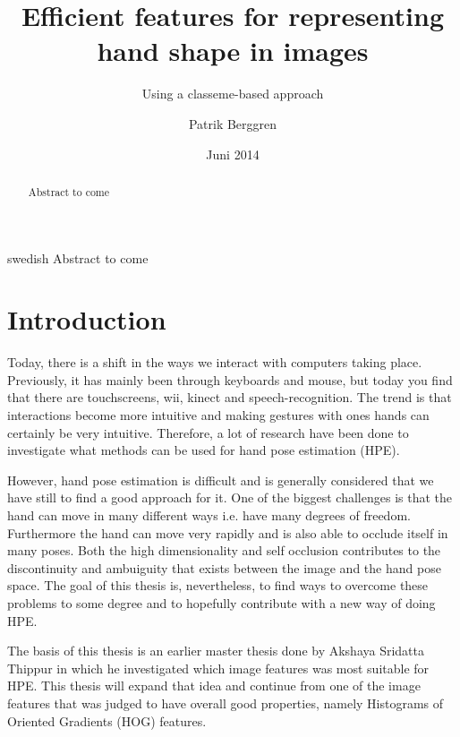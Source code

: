 \documentclass[a4paper,11pt]{kth-mag}
\title{Efficient features for representing hand shape in images}
\subtitle{Using a classeme-based approach}
\author{Patrik Berggren}
\date{Juni 2014}
\begin{document}
\frontmatter
\pagestyle{empty}
\removepagenumbers
\maketitle
{}



\begin{abstract}
Abstract to come
\end{abstract}
\clearpage
\begin{foreignabstract}{swedish}
Abstract to come
\end{foreignabstract}
\clearpage
\tableofcontents*
\mainmatter
\pagestyle{newchap}

\section{Introduction}
Today, there is a shift in the ways we interact with computers taking place.
Previously, it has mainly been through keyboards and mouse, but today you find that there are touchscreens, wii, kinect and speech-recognition.
The trend is that interactions become more intuitive and making gestures with ones hands can certainly be very intuitive.
Therefore, a lot of research have been done to investigate what methods can be used for hand pose estimation (HPE).

However, hand pose estimation is difficult and is generally considered that we have still to find a good approach for it.
One of the biggest challenges is that the hand can move in many different ways i.e. have many degrees of freedom.
Furthermore the hand can move very rapidly and is also able to occlude itself in many poses.
Both the high dimensionality and self occlusion contributes to the discontinuity and ambuiguity that exists between the image and the hand pose space.
The goal of this thesis is, nevertheless, to find ways to overcome these problems to some degree and to hopefully contribute with a new way of doing HPE.

The basis of this thesis is an earlier master thesis done by Akshaya Sridatta Thippur \cite{akshayaMaster} in which he investigated which image features was most suitable for HPE.
This thesis will expand that idea and continue from one of the image features that was judged to have overall good properties, namely Histograms of Oriented Gradients (HOG) features.
 
\end{document}
